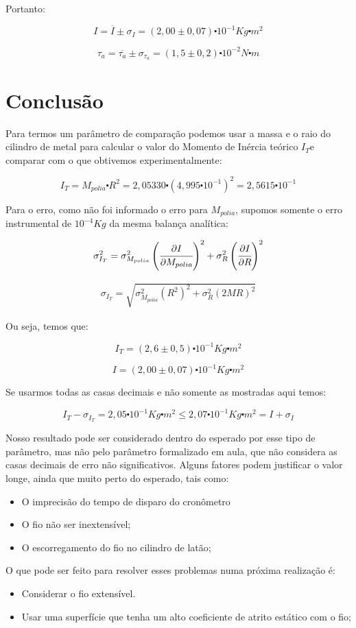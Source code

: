 \documentclass[a4paper]{article}
\begin{document}
Portanto:

$$I=\overline{I}\pm\sigma_{I}=(2,00\pm0,07)\centerdot10^{-1}Kg\centerdot m^{2}$$

$$\tau_{a}=\overline{\tau_{a}}\pm\sigma_{\tau_{a}}=(1,5\pm0,2)\centerdot10^{-2}N\centerdot m$$

\section{Conclusão}

Para termos um parâmetro de comparação podemos usar a massa e o raio do cilindro de metal para calcular o valor do Momento de Inércia teórico
$I_{T}$e comparar com o que obtivemos experimentalmente:

$$I_{T}=M_{polia}\centerdot R^{2}=2,05330\centerdot(4,995\centerdot10^{-1})^{2}=2,5615\centerdot10^{-1}$$

Para o erro, como não foi informado o erro para $M_{polia}$, supomos somente o erro instrumental de $10^{-4}$$Kg$ da mesma balança analítica:

$$
\sigma_{I_{T}}^{2}=\sigma_{M_{polia}}^{2}\left(\cfrac{\partial I}{\partial M_{polia}}\right)^{2}+\sigma_{R}^{2}\left(\cfrac{\partial I}{\partial R}\right)^{2}
$$

\begin{align}
\sigma_{I_{T}}=\sqrt{\sigma_{M_{polia}}^{2}\left(R^{2}\right)^{2}+\sigma_{R}^{2}\left(2MR\right)^{2}}
\end{align}

Ou seja, temos que:

$$I_{T}=(2,6\pm0,5)\centerdot10^{-1}Kg\centerdot m^{2}$$

$$I=(2,00\pm0,07)\centerdot10^{-1}Kg\centerdot m^{2}$$

Se usarmos todas as casas decimais e não somente as mostradas aqui temos:

$$
I_{T}-\sigma_{I_{T}}=2,05\centerdot10^{-1}Kg\centerdot m^{2}\leq2,07\centerdot10^{-1}Kg\centerdot m^{2}=I+\sigma_{I}
$$

Nosso resultado pode ser considerado dentro do esperado por esse tipo de parâmetro, mas não pelo parâmetro formalizado em aula, que não considera as casas decimais de erro não significativos. Alguns fatores podem justificar o valor longe, ainda que muito perto do esperado, tais como:
\begin{itemize}
	\item O imprecisão do tempo de disparo do cronômetro
	\item O fio não ser inextensível;
	\item O escorregamento do fio no cilindro de latão;
\end{itemize}

O que pode ser feito para resolver esses problemas numa próxima realização é:
\begin{itemize}
	\item Considerar o fio extensível.
	\item Usar uma superfície que tenha um alto coeficiente de atrito estático com o fio;
\end{itemize}
\end{document}
